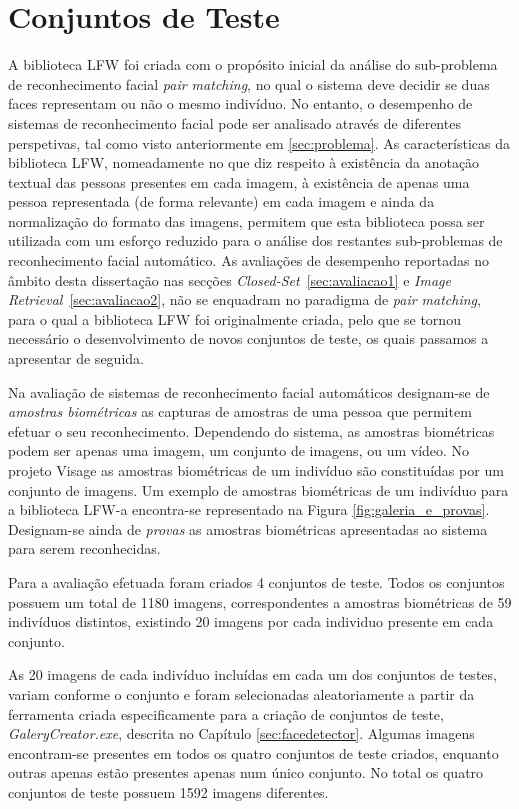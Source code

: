 \section{Conjuntos de Teste}  \label{sec:conjuntos}
A biblioteca LFW foi criada com o propósito inicial da análise do sub-problema de reconhecimento facial \textit{pair matching}, no qual o sistema deve decidir se duas faces representam ou não o mesmo indivíduo. No entanto, o desempenho de sistemas de reconhecimento facial pode ser analisado através de diferentes perspetivas, tal como visto anteriormente em \ref{sec:problema}. As características da biblioteca LFW, nomeadamente no que diz respeito à existência da anotação textual das pessoas presentes em cada imagem, à existência de apenas uma pessoa representada (de forma relevante) em cada imagem e ainda da normalização do formato das imagens, permitem que esta biblioteca possa ser utilizada com um esforço reduzido para o análise dos restantes sub-problemas de reconhecimento facial automático. As avaliações de desempenho reportadas no âmbito desta dissertação nas secções \textit{Closed-Set}~\ref{sec:avaliacao1} e \textit{Image Retrieval}~\ref{sec:avaliacao2}, não se enquadram no paradigma de \textit{pair matching}, para o qual a biblioteca LFW foi originalmente criada, pelo que se tornou necessário o desenvolvimento de novos conjuntos de teste, os quais passamos a apresentar de seguida.

Na avaliação de sistemas de reconhecimento facial automáticos designam-se de \textit{amostras biométricas} as capturas de amostras de uma pessoa que permitem efetuar o seu reconhecimento. Dependendo do sistema, as amostras biométricas podem ser apenas uma imagem, um conjunto de imagens, ou um vídeo. No projeto Visage as amostras biométricas de um indivíduo são constituídas por um conjunto de imagens. Um exemplo de amostras biométricas de um indivíduo para a biblioteca LFW-a encontra-se representado na Figura \ref{fig:galeria_e_provas}. Designam-se ainda de \textit{provas} as amostras biométricas apresentadas ao sistema para serem reconhecidas.

Para a avaliação efetuada foram criados 4 conjuntos de teste. Todos os conjuntos possuem um total de 1180 imagens, correspondentes a amostras biométricas de 59 indivíduos distintos, existindo 20 imagens por cada individuo presente em cada conjunto. 

As 20 imagens de cada indivíduo incluídas em cada um dos conjuntos de testes, variam conforme o conjunto e foram selecionadas aleatoriamente a partir da ferramenta criada especificamente para a criação de conjuntos de teste, \textit{GaleryCreator.exe}, descrita no Capítulo \ref{sec:facedetector}. Algumas imagens encontram-se presentes em todos os quatro conjuntos de teste criados, enquanto outras apenas estão presentes apenas num único conjunto. No total os quatro conjuntos de teste possuem 1592 imagens diferentes.

